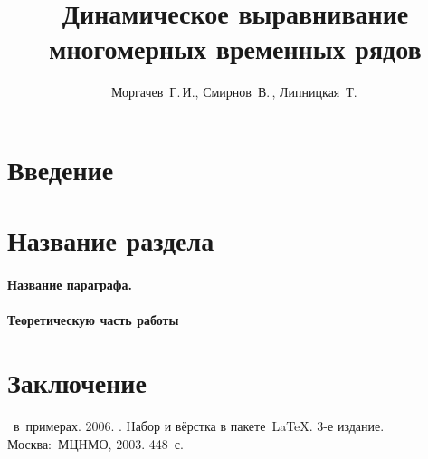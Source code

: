\documentclass[12pt,twoside]{article}
\title
        {Динамическое выравнивание многомерных временных рядов}
\author
        {Моргачев~Г.\,И., Смирнов~В.\,, Липницкая~Т.\,} %
\begin{document}
    \maketitle
    \section{Введение}
    \section{Название раздела}
    \paragraph{Название параграфа.}
    \paragraph{Теоретическую часть работы}
    \section{Заключение}

    
    

    \begin{thebibliography}{1}
       \LaTeXe\ в~примерах.
       2006.
       .
        Набор и вёрстка в пакете~\LaTeX.
       3-е издание.
       Москва:~МЦHМО, 2003.  448~с.
    \end{thebibliography}
    
    
\end{document}
